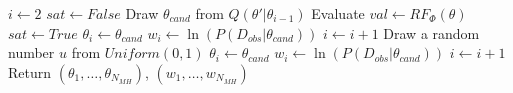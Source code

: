 \begin{algorithm}
      \begin{algorithmic}[H]
            \State $i \leftarrow 2$
            \State $sat \leftarrow False $
            \State Draw $\theta_{cand}$ from $Q(\theta'|\theta_{i-1})$
            \State Evaluate $val \leftarrow RF_{\Phi}(\theta)$
            \State $sat \leftarrow True$
            \EndIf
            \EndWhile
            \State $\theta_i \leftarrow \theta_{cand}$
            \State $w_i \leftarrow \ln(P(D_{obs}|\theta_{cand}))$
            \State $i \leftarrow i + 1$
            \Else
            \State Draw a random number $u$ from $Uniform(0,1)$
            \State $\theta_i \leftarrow \theta_{cand}$
            \State $w_i \leftarrow \ln(P(D_{obs}|\theta_{cand}))$
            \State $i \leftarrow i + 1$
            \EndIf
            \EndIf
            \EndWhile
            \State Return $(\theta_1,\ldots,\theta_{N_{MH}})$, $(w_1,\ldots,w_{N_{MH}})$
            \EndProcedure
      \end{algorithmic}
\end{algorithm}

